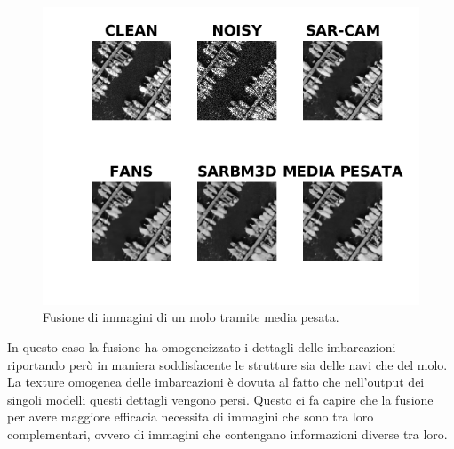   \begin{figure}[H]
    \centering
    \includegraphics[width=1.1\textwidth]{utils/MPharbor03.png}
    \caption{Fusione di immagini di un molo tramite media pesata.}
    \label{fig:airplane00MP}
  \end{figure}
  In questo caso la fusione ha omogeneizzato i dettagli delle imbarcazioni riportando però in maniera soddisfacente le strutture sia delle 
  navi che del molo. La texture omogenea delle imbarcazioni è dovuta al fatto che nell'output dei singoli modelli questi dettagli vengono persi. 
  Questo ci fa capire che la fusione per avere maggiore efficacia necessita di immagini che sono tra loro complementari, ovvero di immagini 
  che contengano informazioni diverse tra loro. 
  
